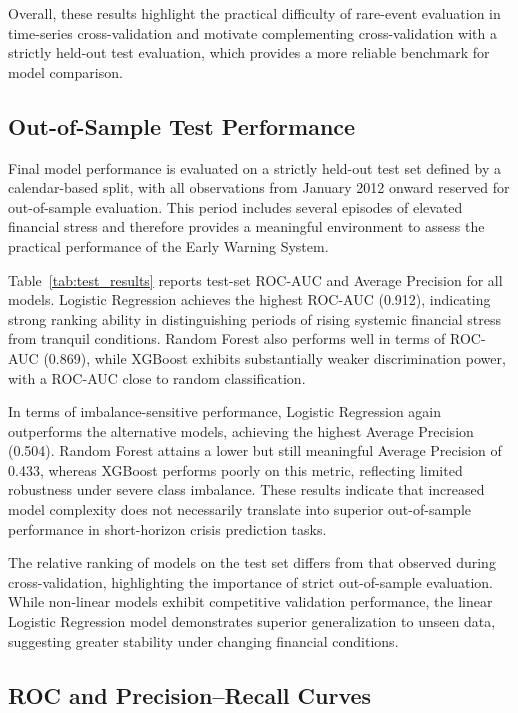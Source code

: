 \documentclass[11pt,a4paper]{article}
\begin{document}
Overall, these results highlight the practical difficulty of rare-event evaluation in time-series cross-validation and motivate complementing cross-validation with a strictly held-out test evaluation, which provides a more reliable benchmark for model comparison.

\subsection{Out-of-Sample Test Performance}
\label{subsec:test_results}

Final model performance is evaluated on a strictly held-out test set defined by a calendar-based split, with all observations from January 2012 onward reserved for out-of-sample evaluation. This period includes several episodes of elevated financial stress and therefore provides a meaningful environment to assess the practical performance of the Early Warning System.

Table~\ref{tab:test_results} reports test-set ROC-AUC and Average Precision for all models. Logistic Regression achieves the highest ROC-AUC (0.912), indicating strong ranking ability in distinguishing periods of rising systemic financial stress from tranquil conditions. Random Forest also performs well in terms of ROC-AUC (0.869), while XGBoost exhibits substantially weaker discrimination power, with a ROC-AUC close to random classification.

In terms of imbalance-sensitive performance, Logistic Regression again outperforms the alternative models, achieving the highest Average Precision (0.504). Random Forest attains a lower but still meaningful Average Precision of 0.433, whereas XGBoost performs poorly on this metric, reflecting limited robustness under severe class imbalance. These results indicate that increased model complexity does not necessarily translate into superior out-of-sample performance in short-horizon crisis prediction tasks.

The relative ranking of models on the test set differs from that observed during cross-validation, highlighting the importance of strict out-of-sample evaluation. While non-linear models exhibit competitive validation performance, the linear Logistic Regression model demonstrates superior generalization to unseen data, suggesting greater stability under changing financial conditions.

\subsection{ROC and Precision--Recall Curves}
\label{subsec:roc_pr_curves}
\end{document}
